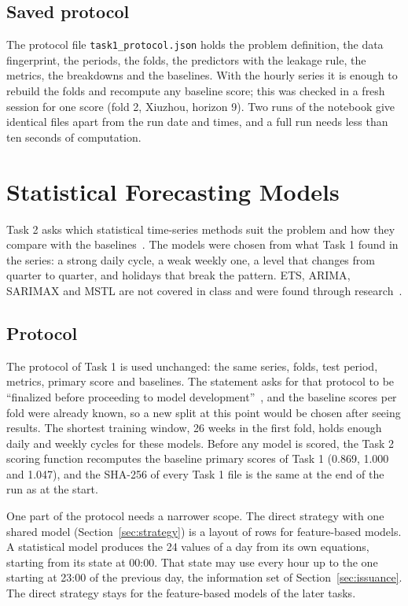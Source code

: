 \documentclass[12pt,a4paper,openany]{report}
\begin{document}
\section{Saved protocol}\label{sec:saved}

The protocol file \texttt{task1\_protocol.json} holds the problem definition, the data fingerprint, the periods, the
folds, the predictors with the leakage rule, the metrics, the breakdowns and the baselines. With the hourly series it
is enough to rebuild the folds and recompute any baseline score; this was checked in a fresh session for one score
(fold 2, Xiuzhou, horizon 9). Two runs of the notebook give identical files apart from the run date and times, and a
full run needs less than ten seconds of computation.

\chapter{Statistical Forecasting Models}\label{ch:stat}

Task 2 asks which statistical time-series methods suit the problem and how they compare with the
baselines~\cite{brief}. The models were chosen from what Task 1 found in the series: a strong daily cycle, a weak
weekly one, a level that changes from quarter to quarter, and holidays that break the pattern. \ac{ETS}, \ac{ARIMA},
\ac{SARIMAX} and \ac{MSTL} are not covered in class and were found through research~\cite{fpp3,bandara2021}.

\section{Protocol}\label{sec:stat-protocol}

The protocol of Task 1 is used unchanged: the same series, folds, test period, metrics, primary score and baselines.
The statement asks for that protocol to be ``finalized before proceeding to model development''~\cite{brief}, and the
baseline scores per fold were already known, so a new split at this point would be chosen after seeing results. The
shortest training window, 26 weeks in the first fold, holds enough daily and weekly cycles for these models. Before
any model is scored, the Task 2 scoring function recomputes the baseline primary scores of Task 1 (0.869, 1.000 and
1.047), and the SHA-256 of every Task 1 file is the same at the end of the run as at the start.

One part of the protocol needs a narrower scope. The direct strategy with one shared model
(Section~\ref{sec:strategy}) is a layout of rows for feature-based models. A statistical model produces the 24 values
of a day from its own equations, starting from its state at 00:00. That state may use every hour up to the one
starting at 23:00 of the previous day, the information set of Section~\ref{sec:issuance}. The direct
strategy stays for the feature-based models of the later tasks.
\end{document}

